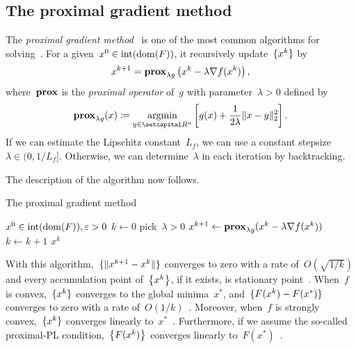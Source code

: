\documentclass[../../main]{subfiles}
\begin{document}
\subsection{The proximal gradient method} 
The \emph{proximal gradient method}~\cite{Fukushima1981} is one of the most common algorithms for solving~.
For a given~$x^0 \in \interior (\dom (F))$, it recursively update~$\set{x^k} $ by
\begin{equation}
    x^{k + 1} = \prox_{\lambda g} \left( x^k - \lambda \nabla f(x^k) \right) 
,\end{equation} 
where~$\prox$ is the \emph{proximal operator} of~$g$ with parameter~$\lambda > 0$ defined by
\begin{equation}
    \prox_{\lambda g}(x) \coloneqq \argmin_{y \in \setR^n} \left[ g(x) + \frac{1}{2 \lambda} \norm{x - y}_2^2 \right] 
.\end{equation} 
If we can estimate the Lipschitz constant~$L_f$, we can use a constant stepsize~$\lambda \in (0, 1 / L_f]$.
Otherwise, we can determine~$\lambda$ in each iteration by backtracking.

The description of the algorithm now follows.
\begin{algorithm}[hbtp]
    \caption{The proximal gradient method}
    \begin{algorithmic}[1]
        \Require $x^0 \in \interior (\dom (F)), \varepsilon > 0$
        \State $k \gets 0$
        \Repeat
        \State pick~$\lambda > 0$
        \State $x^{k + 1} \gets \prox_{\lambda g}(x^k - \lambda \nabla f(x^k))$
        \State $k \gets k + 1$
        \State \Return $x^k$
    \end{algorithmic}
\end{algorithm}

With this algorithm,~$\set{\norm{x^{k + 1} - x^k}}$ converges to zero with a rate of~$O(\sqrt{1 / k})$ and every accumulation point of~$\set*{x^k}$, if it exists, is stationary point~\cite{Beck2017}.
When~$f$ is convex,~$\set{x^k}$ converges to the global minima~$x^\ast$, and~$\set{F(x^k) - F(x^\ast)}$ converges to zero with a rate of~$O(1 / k)$~\cite{Beck2017}.
Moreover, when~$f$ is strongly convex,~$\set{x^k}$ converges linearly to~$x^\ast$~\cite{Beck2017}.
Furthermore, if we assume the so-called proximal-PL condition,~$\set*{F(x^k)}$ converges linearly to~$F(x^\ast)$~\cite{Karimi2016}.
\end{document}

